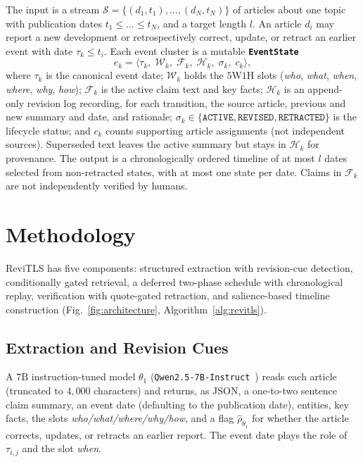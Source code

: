 \documentclass[journal]{IEEEtran}
\begin{document}
The input is a stream $\mathcal{S}=\{(d_1,t_1),\dots,(d_N,t_N)\}$ of articles about one topic with publication dates $t_1\le\dots\le t_N$, and a target length $l$. An article $d_i$ may report a new development or retrospectively correct, update, or retract an earlier event with date $\tau_k\le t_i$. Each event cluster is a mutable \textbf{\texttt{EventState}}
\begin{equation}
e_k = \langle \tau_k,\; \mathcal{W}_k,\; \mathcal{F}_k,\; \mathcal{H}_k,\; \sigma_k,\; c_k \rangle,
\label{eq:event_state}
\end{equation}
where $\tau_k$ is the canonical event date; $\mathcal{W}_k$ holds the $5\text{W}1\text{H}$ slots (\textit{who}, \textit{what}, \textit{when}, \textit{where}, \textit{why}, \textit{how}); $\mathcal{F}_k$ is the active claim text and key facts; $\mathcal{H}_k$ is an append-only revision log recording, for each transition, the source article, previous and new summary and date, and rationale; $\sigma_k\in\{\texttt{ACTIVE},\texttt{REVISED},\texttt{RETRACTED}\}$ is the lifecycle status; and $c_k$ counts supporting article assignments (not independent sources). Superseded text leaves the active summary but stays in $\mathcal{H}_k$ for provenance. The output is a chronologically ordered timeline of at most $l$ dates selected from non-retracted states, with at most one state per date. Claims in $\mathcal{F}_k$ are not independently verified by humans.

\section{Methodology}
\label{sec:methodology}

ReviTLS has five components: structured extraction with revision-cue detection, conditionally gated retrieval, a deferred two-phase schedule with chronological replay, verification with quote-gated retraction, and salience-based timeline construction (Fig.~\ref{fig:architecture}, Algorithm~\ref{alg:revitls}).



\subsection{Extraction and Revision Cues}
\label{subsec:extraction}

A $7\text{B}$ instruction-tuned model $\theta_1$ (\texttt{Qwen2.5-7B-Instruct}~\cite{qwen25}) reads each article (truncated to $4{,}000$ characters) and returns, as JSON, a one-to-two sentence claim summary, an event date (defaulting to the publication date), entities, key facts, the slots \textit{who/what/where/why/how}, and a flag $\hat\rho_{\theta_1}$ for whether the article corrects, updates, or retracts an earlier report. The event date plays the role of $\tau_{i,j}$ and the slot \textit{when}.
\end{document}

